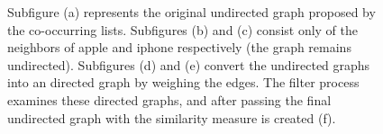\begin{figure}[tbh]
{}
\caption{Subfigure (a) represents the original undirected graph proposed by the co-occurring lists. Subfigures (b) and (c) consist only of the neighbors of apple and iphone respectively (the graph remains undirected). Subfigures (d) and (e) convert the undirected graphs into an directed graph by weighing the edges. The filter process examines these directed graphs, and after passing the final undirected graph with the similarity measure is created (f).}
\label{fig:words}
\end{figure}

